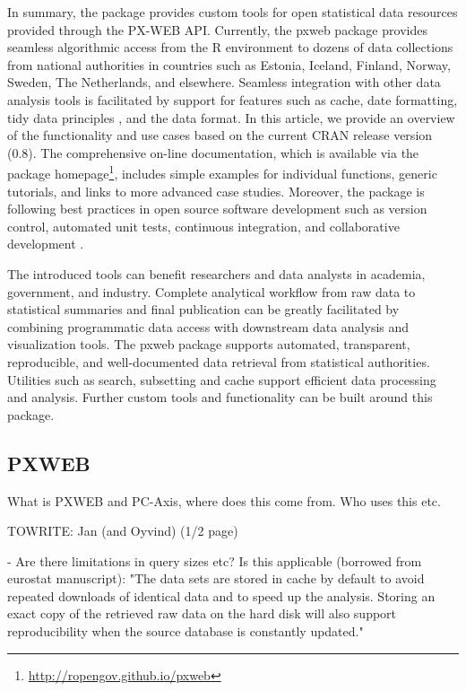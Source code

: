 In summary, the  package provides custom tools for open statistical data resources provided through the PX-WEB API. Currently, the pxweb package provides seamless algorithmic access from the R environment to dozens of data collections from national authorities in countries such as Estonia, Iceland, Finland, Norway, Sweden, The Netherlands, and elsewhere. Seamless integration with other data analysis tools is facilitated by support for features such as cache, date formatting, tidy data principles \citep{wickham2014}, and the  \citep{tibble} data format. In this article, we provide an overview of the functionality and use cases based on the current CRAN release version (0.8). The comprehensive on-line documentation, which is available via the package homepage\footnote{\url{http://ropengov.github.io/pxweb}}, includes simple examples for individual functions, generic tutorials, and links to more advanced case studies. Moreover, the package is following best practices in open source software development such as version control, automated unit tests, continuous integration, and collaborative development \citep{PerezRiverol2016}.

The introduced tools can benefit researchers and data analysts in academia, government, and industry. Complete analytical workflow from raw data to statistical summaries and final publication can be greatly facilitated by combining programmatic data access with downstream data analysis and visualization tools. The pxweb package supports automated, transparent, reproducible, and well-documented data retrieval from statistical authorities. Utilities such as search, subsetting and cache support efficient data processing and analysis. Further custom tools and functionality can be built around this package. 


\subsection[PXWEB and PC-Axis]{PXWEB}

What is PXWEB and PC-Axis, where does this come from. Who uses this etc.

TOWRITE: Jan (and Oyvind) (1/2 page)

- Are there limitations in query sizes etc? Is this applicable (borrowed from eurostat manuscript): "The data sets are stored in cache by default to avoid repeated downloads of identical data and to speed up the analysis. Storing an exact copy of the retrieved raw data on the hard disk will also support reproducibility when the source database is constantly updated."



